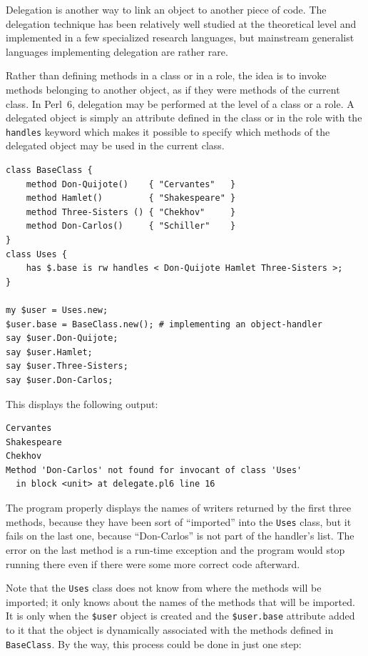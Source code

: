 Delegation is another way to link an object to another piece 
of code. The delegation technique has been relatively well 
studied at the theoretical level and implemented in a few 
specialized research languages, but mainstream generalist 
languages implementing delegation are rather rare.

Rather than defining methods in a class or in a role, the 
idea is to invoke methods belonging to another object, as 
if they were methods of the current class. In Perl~6, delegation 
may be performed at the level of a class or a role. A delegated 
object is simply an attribute defined in the class or in the role 
with the {\tt handles} keyword which makes it possible to specify 
which methods of the delegated object may be used in the 
current class.

  
   
  
\begin{verbatim}
class BaseClass {
    method Don-Quijote()    { "Cervantes"   }
    method Hamlet()         { "Shakespeare" }
    method Three-Sisters () { "Chekhov"     }
    method Don-Carlos()     { "Schiller"    }
}
class Uses { 
    has $.base is rw handles < Don-Quijote Hamlet Three-Sisters >;
}

my $user = Uses.new;
$user.base = BaseClass.new(); # implementing an object-handler
say $user.Don-Quijote;
say $user.Hamlet;
say $user.Three-Sisters;
say $user.Don-Carlos;
\end{verbatim}

This displays the following output:

\begin{verbatim}
Cervantes
Shakespeare
Chekhov
Method 'Don-Carlos' not found for invocant of class 'Uses'
  in block <unit> at delegate.pl6 line 16
\end{verbatim}

The program properly displays the names of writers returned 
by the first three methods, because they have been sort of 
``imported'' into the {\tt Uses} class, but it fails on the 
last one, because ``Don-Carlos'' is not part of the handler's 
list. The error on the last method is a run-time exception 
and the program would stop running there even if there 
were some more correct code afterward. 

Note that the {\tt Uses} class does not know from where the 
methods will be imported; it only knows about the names of 
the methods that will be imported. It is only when the 
\verb'$user' object is created and the \verb'$user.base' 
attribute added to it that the object is dynamically 
associated with the methods defined in {\tt BaseClass}. 
By the way, this process could be done in just one step:

